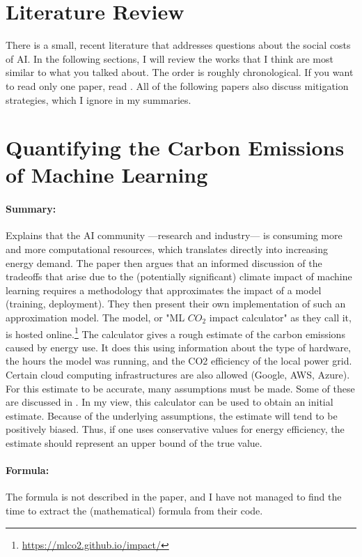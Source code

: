 
\section{Literature Review}

There is a small, recent literature that addresses questions about the social costs of
AI. In the following sections, I will review the works that I think are most similar to
what you talked about. The order is roughly chronological. If you want to read only one
paper, read . All of the following papers also discuss mitigation
strategies, which I ignore in my summaries.


\section{Quantifying the Carbon Emissions of Machine Learning}
\centerline{}
\vspace{1em}

\paragraph{Summary:} Explains that the AI community ---research and industry--- is
consuming more and more computational resources, which translates directly into
increasing energy demand. The paper then argues that an informed discussion of the
tradeoffs that arise due to the (potentially significant) climate impact of machine
learning requires a methodology that approximates the impact of a model (training,
deployment). They then present their own implementation of such an approximation model.
The model, or "ML $CO_2$ impact calculator" as they call it, is hosted
online.\footnote{\url{https://mlco2.github.io/impact/}} The calculator gives a rough
estimate of the carbon emissions caused by energy use.  It does this using information
about the type of hardware, the hours the model was running, and the CO2 efficiency of
the local power grid. Certain cloud computing infrastructures are also allowed (Google,
AWS, Azure). For this estimate to be accurate, many assumptions must be made. Some of
these are discussed in . In my view, this calculator can be
used to obtain an initial estimate. Because of the underlying assumptions, the estimate
will tend to be positively biased. Thus, if one uses conservative values for energy
efficiency, the estimate should represent an upper bound of the true value.

\paragraph{Formula:} The formula is not described in the paper, and I have not managed
to find the time to extract the (mathematical) formula from their code.

